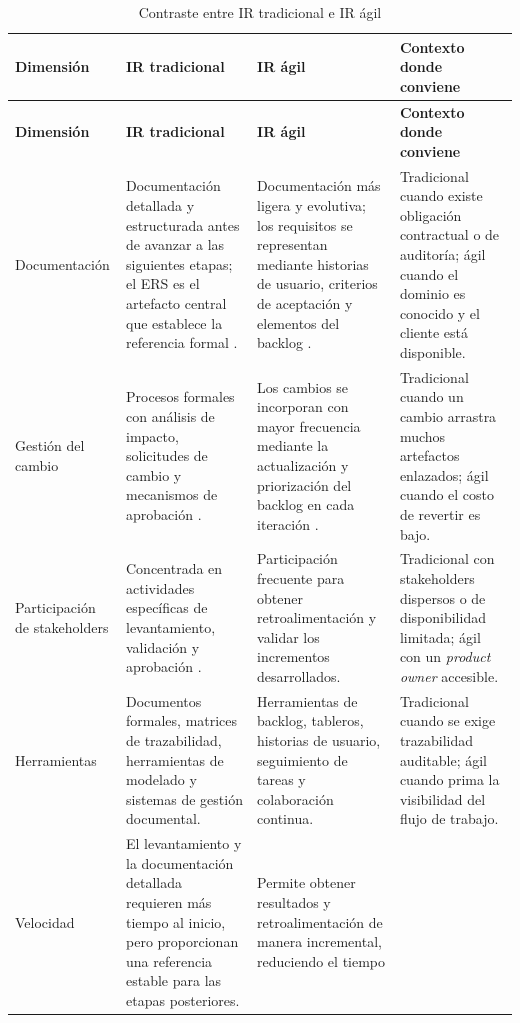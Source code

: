 \documentclass[journal,onecolumn]{IEEEtran}
\begin{document}
	\begin{longtable}{L{2.0cm} L{3.9cm} L{3.9cm} L{3.3cm}}
		\caption{Contraste entre IR tradicional e IR ágil}\label{tab:trad-agil}\\
		\toprule
		\textbf{Dimensión} & \textbf{IR tradicional} & \textbf{IR ágil} &
		\textbf{Contexto donde conviene} \\
		\midrule
		\endfirsthead
		\toprule
		\textbf{Dimensión} & \textbf{IR tradicional} & \textbf{IR ágil} &
		\textbf{Contexto donde conviene} \\
		\midrule
		\endhead
		\bottomrule
		\endfoot
		Documentación &
		Documentación detallada y estructurada antes de avanzar a las siguientes etapas; el ERS es el
		artefacto central que establece la referencia formal \cite{pohl2025}. &
		Documentación más ligera y evolutiva; los requisitos se representan mediante historias de
		usuario, criterios de aceptación y elementos del backlog \cite{cohn2004}. &
		Tradicional cuando existe obligación contractual o de auditoría; ágil cuando el dominio es
		conocido y el cliente está disponible. \\
		\addlinespace
		Gestión del cambio &
		Procesos formales con análisis de impacto, solicitudes de cambio y mecanismos de aprobación
		\cite{pmbok7}. &
		Los cambios se incorporan con mayor frecuencia mediante la actualización y priorización del
		backlog en cada iteración \cite{cohn2004}. &
		Tradicional cuando un cambio arrastra muchos artefactos enlazados; ágil cuando el costo de
		revertir es bajo. \\
		\addlinespace
		Participación de stakeholders &
		Concentrada en actividades específicas de levantamiento, validación y aprobación
		\cite{wiegers2013}. &
		Participación frecuente para obtener retroalimentación y validar los incrementos
		desarrollados. &
		Tradicional con stakeholders dispersos o de disponibilidad limitada; ágil con un
		\emph{product owner} accesible. \\
		\addlinespace
		Herramientas &
		Documentos formales, matrices de trazabilidad, herramientas de modelado y sistemas de gestión
		documental. &
		Herramientas de backlog, tableros, historias de usuario, seguimiento de tareas y colaboración
		continua. &
		Tradicional cuando se exige trazabilidad auditable; ágil cuando prima la visibilidad del flujo
		de trabajo. \\
		\addlinespace
		Velocidad &
		El levantamiento y la documentación detallada requieren más tiempo al inicio, pero
		proporcionan una referencia estable para las etapas posteriores. &
		Permite obtener resultados y retroalimentación de manera incremental, reduciendo el tiempo

\end{longtable}
\end{document}
